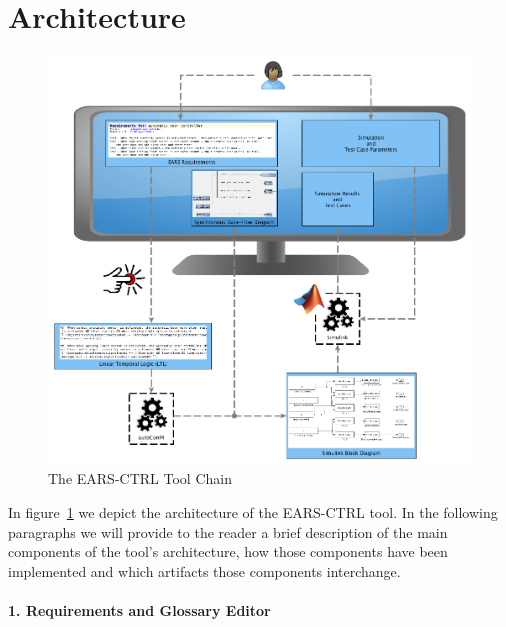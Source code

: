 \section{Architecture}

\begin{figure}[t]
   \begin{center}
     \includegraphics[width=1\textwidth]{images/toolchain.png}
     \caption{The \textsf{EARS-CTRL} Tool Chain}
     \label{fig:ears_ctrl_toolchain}
   \end{center}
 \end{figure}
 
In figure~\ref{fig:ears_ctrl_toolchain} we depict the architecture of the
\textsf{EARS-CTRL} tool. In the following paragraphs we will provide to the
reader a brief description of the main components of the tool's architecture,
how those components have been implemented and which artifacts those
components interchange. 
 
\paragraph{1. Requirements and Glossary Editor\\\\} 

